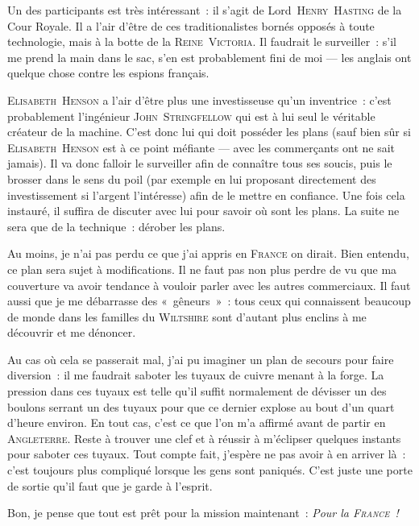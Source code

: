 {Un des participants est très intéressant~:  il s’agit de Lord~\textsc{Henry~Hasting} de la Cour Royale.
Il a l’air d’être de ces traditionalistes bornés opposés à toute technologie, mais à la botte de la \textsc{Reine~Victoria}.
Il faudrait le surveiller~:  s’il me prend la main dans le sac, s’en est probablement fini de moi — les anglais ont quelque chose contre les espions français.

\textsc{Elisabeth~Henson} a l’air d’être plus une investisseuse qu’un inventrice~:  c’est probablement l’ingénieur \textsc{John~Stringfellow} qui est à lui seul le véritable créateur de la machine.
C’est donc lui qui doit posséder les plans (sauf bien sûr si \textsc{Elisabeth~Henson} est à ce point méfiante — avec les commerçants ont ne sait jamais).
Il va donc falloir le surveiller afin de connaître tous ses soucis, puis le brosser dans le sens du poil (par exemple en lui proposant directement des investissement si l’argent l’intéresse) afin de le mettre en confiance.
Une fois cela instauré, il suffira de discuter avec lui pour savoir où sont les plans.
La suite ne sera que de la technique~:  dérober les plans.

Au moins, je n’ai pas perdu ce que j’ai appris en \textsc{France} on dirait.
Bien entendu, ce plan sera sujet à modifications.
Il ne faut pas non plus perdre de vu que ma couverture va avoir tendance à vouloir parler avec les autres commerciaux.
Il faut aussi que je me débarrasse des «~gêneurs~»~:  tous ceux qui connaissent beaucoup de monde dans les familles du \textsc{Wiltshire} sont d’autant plus enclins à me découvrir et me dénoncer.

Au cas où cela se passerait mal, j’ai pu imaginer un plan de secours pour faire diversion~:  il me faudrait saboter les tuyaux de cuivre menant à la forge.
La pression dans ces tuyaux est telle qu’il suffit normalement de dévisser un des boulons serrant un des tuyaux pour que ce dernier explose au bout d’un quart d’heure environ.
En tout cas, c’est ce que l’on m’a affirmé avant de partir en \textsc{Angleterre}.
Reste à trouver une clef et à réussir à m’éclipser quelques instants pour saboter ces tuyaux.
Tout compte fait, j’espère ne pas avoir à en arriver là~:  c’est toujours plus compliqué lorsque les gens sont paniqués.
C’est juste une porte de sortie qu’il faut que je garde à l’esprit.

Bon, je pense que tout est prêt pour la mission maintenant~:  \emph{Pour la \textsc{France}~!}
}

